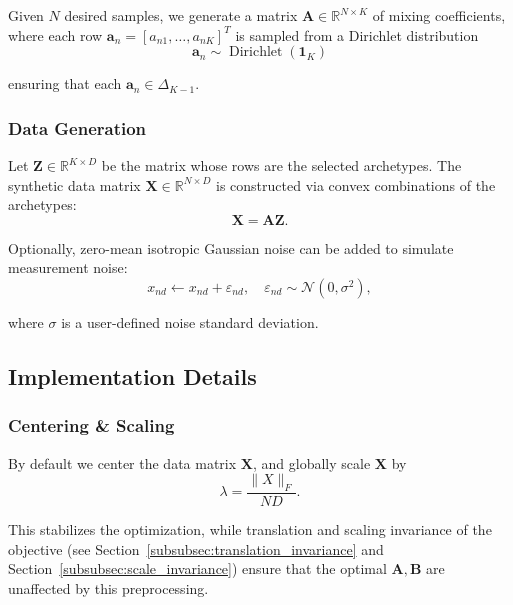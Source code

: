 \documentclass[oneside]{article}
\begin{document}
Given $N$ desired samples, we generate a matrix $\mathbf{A} \in \mathbb{R}^{N \times K}$ of mixing coefficients, where each row $\mathbf{a}_n = [a_{n1}, \dots, a_{nK}]^T$ is sampled from a Dirichlet distribution
\begin{equation}
    \mathbf{a}_n \sim \operatorname{Dirichlet}(\mathbf{1}_K)
\end{equation}

ensuring that each $\mathbf{a}_n \in \Delta_{K-1}$.

\subsubsection{Data Generation}

Let $\mathbf{Z} \in \mathbb{R}^{K \times D}$ be the matrix whose rows are the selected archetypes. The synthetic data matrix $\mathbf{X} \in \mathbb{R}^{N \times D}$ is constructed via convex combinations of the archetypes:
\begin{equation}
\mathbf{X} = \mathbf{A} \mathbf{Z}.
\end{equation}

Optionally, zero-mean isotropic Gaussian noise can be added to simulate measurement noise:
\begin{equation}
    x_{nd} \leftarrow x_{nd} + \varepsilon_{nd}, \quad \varepsilon_{nd} \sim \mathcal{N}(0, \sigma^2),
\end{equation}

where $\sigma$ is a user-defined noise standard deviation.

\subsection{Implementation Details}

\subsubsection{Centering \& Scaling}

By default we center the data matrix $\mathbf{X}$, and globally scale $\mathbf{X}$ by
\begin{equation}
    \lambda = \frac{\| X \|_F}{N D}.
\end{equation}

This stabilizes the optimization, while translation and scaling invariance of the objective (see Section~\ref{subsubsec:translation_invariance} and Section~\ref{subsubsec:scale_invariance}) ensure that the optimal $\mathbf{A}, \mathbf{B}$ are unaffected by this preprocessing.
\end{document}
